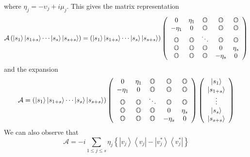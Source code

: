 \documentclass[aps,preprint]{revtex4}%
\begin{document}
where $\eta_{j}=-\upsilon_{j}+i\mu_{j}$. This gives the matrix representation
\begin{equation}
\mathcal{A}\left(  \left\vert s_{1}\right\rangle \left\vert s_{1+s}%
\right\rangle \cdots\left\vert s_{s}\right\rangle \left\vert s_{s+s}%
\right\rangle \right)  =\left(  \left\vert s_{1}\right\rangle \left\vert
s_{1+s}\right\rangle \cdots\left\vert s_{s}\right\rangle \left\vert
s_{s+s}\right\rangle \right)  \left(
\begin{array}
[c]{ccccc}%
0 & \eta_{1} & \mathbb{O} & \mathbb{O} & \mathbb{O}\\
-\eta_{1} & 0 & \mathbb{O} & \mathbb{O} & \mathbb{O}\\
\mathbb{O} & \mathbb{O} & \ddots & \mathbb{O} & \mathbb{O}\\
\mathbb{O} & \mathbb{O} & \mathbb{O} & 0 & \eta_{s}\\
\mathbb{O} & \mathbb{O} & \mathbb{O} & -\eta_{s} & 0
\end{array}
\right)
\end{equation}
and the expansion
\begin{equation}
\mathcal{A}=\left(  \left\vert s_{1}\right\rangle \left\vert s_{1+s}%
\right\rangle \cdots\left\vert s_{s}\right\rangle \left\vert s_{s+s}%
\right\rangle \right)  \left(
\begin{array}
[c]{ccccc}%
0 & \eta_{1} & \mathbb{O} & \mathbb{O} & \mathbb{O}\\
-\eta_{1} & 0 & \mathbb{O} & \mathbb{O} & \mathbb{O}\\
\mathbb{O} & \mathbb{O} & \ddots & \mathbb{O} & \mathbb{O}\\
\mathbb{O} & \mathbb{O} & \mathbb{O} & 0 & \eta_{s}\\
\mathbb{O} & \mathbb{O} & \mathbb{O} & -\eta_{s} & 0
\end{array}
\right)  \left(
\begin{array}
[c]{c}%
\left\vert s_{1}\right\rangle \\
\left\vert s_{1+s}\right\rangle \\
\vdots\\
\left\vert s_{s}\right\rangle \\
\left\vert s_{s+s}\right\rangle
\end{array}
\right)
\end{equation}
We can also observe that
\begin{equation}
\mathcal{A}=-i\sum_{1\leq j\leq s}\eta_{j}\left\{  \left\vert v_{j}%
\right\rangle \left\langle v_{j}\right\vert -\left\vert v_{j}^{\ast
}\right\rangle \left\langle v_{j}^{\ast}\right\vert \right\}
\end{equation}
\end{document}
